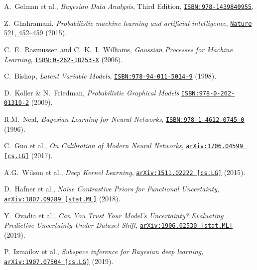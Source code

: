 \documentclass{article}
\begin{document}
\begin{thebibliography}{11}
    A.~Gelman et al.,
    \textit{Bayesian Data Analysis}, Third Edition,
    \href{http://www.stat.columbia.edu/~gelman/book/}{\texttt{ISBN:978-1439840955}}.

    Z.~Ghahramani,
    \textit{Probabilistic machine learning and artificial intelligence},
    \href{https://doi.org/10.1038/nature14541}{\texttt{Nature} 521, 452–459} (2015).

    C.~E.~Rasmussen and C.~K.~I.~Williams, 
    \textit{Gaussian Processes for Machine Learning}, 
    \href{http://www.gaussianprocess.org/gpml/}{\texttt{ISBN:0-262-18253-X}} (2006).

    C.~Bishop,
    \textit{Latent Variable Models},
    \href{https://doi.org/10.1007/978-94-011-5014-9_13}{\texttt{ISBN:978-94-011-5014-9}} (1998).

    D.~Koller \& N.~Friedman,
    \textit{Probabilistic Graphical Models}
    \href{https://mitpress.mit.edu/books/probabilistic-graphical-models}{\texttt{ISBN:978-0-262-01319-2}} (2009).

    R.M.~Neal,
    \textit{Bayesian Learning for Neural Networks},
    \href{https://www.springer.com/de/book/9780387947242}{\texttt{ISBN:978-1-4612-0745-0}} (1996).

    C.~Guo et al.,
    \textit{On Calibration of Modern Neural Networks},
    \href{https://arxiv.org/abs/1706.04599}{\texttt{arXiv:1706.04599 [cs.LG]}} (2017).

    A.G.~Wilson et al.,
    \textit{Deep Kernel Learning},
    \href{https://arxiv.org/abs/1511.02222}{\texttt{arXiv:1511.02222 [cs.LG]}} (2015).

    D.~Hafner et al.,
    \textit{Noise Contrastive Priors for Functional Uncertainty},
    \href{https://arxiv.org/abs/1807.09289}{\texttt{arXiv:1807.09289 [stat.ML]}} (2018).
    
    Y.~Ovadia et al.,
    \textit{Can You Trust Your Model's Uncertainty? Evaluating Predictive Uncertainty Under Dataset Shift},
    \href{https://arxiv.org/abs/1906.02530}{\texttt{arXiv:1906.02530 [stat.ML]}} (2019).

    P.~Izmailov et al.,
    \textit{Subspace inference for Bayesian deep learning},
    \href{https://arxiv.org/abs/1907.07504}{\texttt{arXiv:1907.07504 [cs.LG]}} (2019).


\end{thebibliography}
\end{document}
